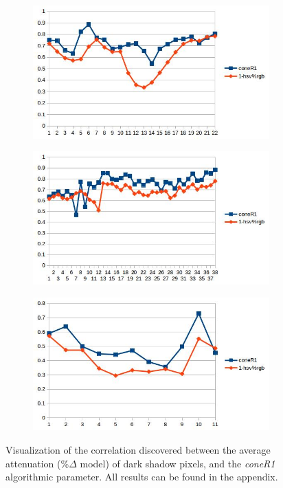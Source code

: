 \documentclass[12pt]{report}
\begin{document}
\begin{figure}
  \centering
  \begin{subfigure}{1\linewidth}
  \includegraphics[width=1\linewidth]{figures/correlations/rgb/room_hsv.jpg}
  \caption{}
\end{subfigure}
\hfill
\begin{subfigure}{.49\linewidth}
  \includegraphics[width=1\linewidth]{figures/correlations/rgb/campus_hsv.jpg}
  \caption{}
\end{subfigure}
\begin{subfigure}{.49\linewidth}
  \includegraphics[width=1\linewidth]{figures/correlations/rgb/pets2_hsv.jpg}
  \caption{}
\end{subfigure}

\caption{Visualization of the correlation discovered between the average attenuation (\%$\Delta$ model) of dark shadow pixels, and the \textit{coneR1} algorithmic parameter. All results can be found in the appendix.}
\label{fig:corr_rgb}
\end{figure}
\end{document}
